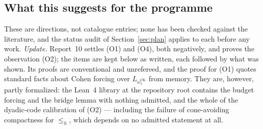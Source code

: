 \documentclass[11pt,a4paper]{article}
\theoremstyle{definition}\newtheorem{definition}[theorem]{Definition}
\theoremstyle{remark}\newtheorem{remark}[theorem]{Remark}
\begin{document}
\subsection{What this suggests for the programme}
\label{sec:ordinals-targets}
These are directions, not catalogue entries; none has been checked against the literature, and the status audit of Section~\ref{sec:plan} applies to each before any work. \emph{Update.} Report~10 \cite{ReportTen} settles (O1) and (O4), both negatively, and proves the observation (O2); the items are kept below as written, each followed by what was shown. Its proofs are conventional and unrefereed, and the proof for (O1) quotes standard facts about Cohen forcing over $L_{\omega_1^{\mathrm{CK}}}$ from memory. They are, however, partly formalized: the Lean~4 library  at the repository root contains the budget forcing and the bridge lemma with nothing admitted, and the whole of the dyadic-code calibration of (O2) --- including the failure of cone-avoiding compactness for $\le_h$, which depends on no admitted statement at all.
\end{document}
